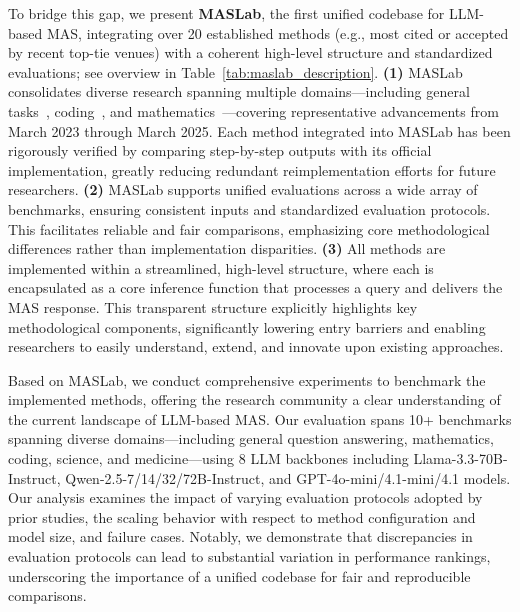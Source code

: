 \documentclass{article}
\begin{document}
To bridge this gap, we present \textbf{MASLab}, the first unified codebase for LLM-based MAS, integrating over 20 established methods (e.g., most cited or accepted by recent top-tie venues) with a coherent high-level structure and standardized evaluations; see overview in Table~\ref{tab:maslab_description}.
\textbf{(1)} MASLab consolidates diverse research spanning multiple domains—including general tasks~\cite{chen2023agentverse}, coding~\cite{qian2024chatdev}, and mathematics~\cite{leimacm}—covering representative advancements from March 2023 through March 2025.
Each method integrated into MASLab has been rigorously verified by comparing step-by-step outputs with its official implementation, greatly reducing redundant reimplementation efforts for future researchers. 
\textbf{(2)} MASLab supports unified evaluations across a wide array of benchmarks, ensuring consistent inputs and standardized evaluation protocols.
This facilitates reliable and fair comparisons, emphasizing core methodological differences rather than implementation disparities.
\textbf{(3)} All methods are implemented within a streamlined, high-level structure, where each is encapsulated as a core inference function that processes a query and delivers the MAS response.
This transparent structure explicitly highlights key methodological components, significantly lowering entry barriers and enabling researchers to easily understand, extend, and innovate upon existing approaches.

Based on MASLab, we conduct comprehensive experiments to benchmark the implemented methods, offering the research community a clear understanding of the current landscape of LLM-based MAS.
Our evaluation spans 10+ benchmarks spanning diverse domains—including general question answering, mathematics, coding, science, and medicine—using 8 LLM backbones including Llama-3.3-70B-Instruct, Qwen-2.5-7/14/32/72B-Instruct, and GPT-4o-mini/4.1-mini/4.1 models.
Our analysis examines the impact of varying evaluation protocols adopted by prior studies, the scaling behavior with respect to method configuration and model size, and failure cases.
Notably, we demonstrate that discrepancies in evaluation protocols can lead to substantial variation in performance rankings, underscoring the importance of a unified codebase for fair and reproducible comparisons.
\end{document}
